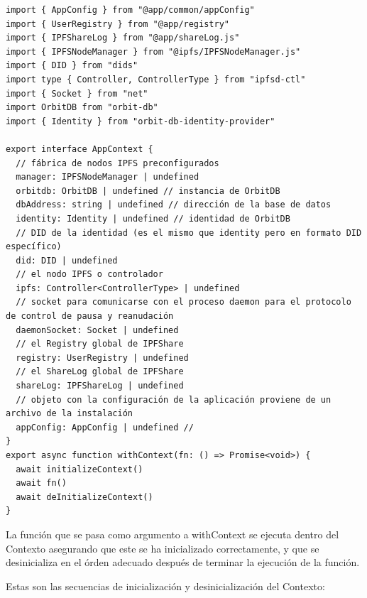 \begin{verbatim}
import { AppConfig } from "@app/common/appConfig"
import { UserRegistry } from "@app/registry"
import { IPFShareLog } from "@app/shareLog.js"
import { IPFSNodeManager } from "@ipfs/IPFSNodeManager.js"
import { DID } from "dids"
import type { Controller, ControllerType } from "ipfsd-ctl"
import { Socket } from "net"
import OrbitDB from "orbit-db"
import { Identity } from "orbit-db-identity-provider"

export interface AppContext {
  // fábrica de nodos IPFS preconfigurados
  manager: IPFSNodeManager | undefined
  orbitdb: OrbitDB | undefined // instancia de OrbitDB
  dbAddress: string | undefined // dirección de la base de datos
  identity: Identity | undefined // identidad de OrbitDB
  // DID de la identidad (es el mismo que identity pero en formato DID específico)
  did: DID | undefined 
  // el nodo IPFS o controlador
  ipfs: Controller<ControllerType> | undefined 
  // socket para comunicarse con el proceso daemon para el protocolo de control de pausa y reanudación
  daemonSocket: Socket | undefined 
  // el Registry global de IPFShare
  registry: UserRegistry | undefined
  // el ShareLog global de IPFShare
  shareLog: IPFShareLog | undefined
  // objeto con la configuración de la aplicación proviene de un archivo de la instalación
  appConfig: AppConfig | undefined // 
}
export async function withContext(fn: () => Promise<void>) {
  await initializeContext()
  await fn()
  await deInitializeContext()
}
\end{verbatim}
La función que se pasa como argumento a withContext se ejecuta dentro del Contexto asegurando que este se ha inicializado correctamente, y que se desinicializa en el órden adecuado después de terminar la ejecución de la función.

Estas son las secuencias de inicialización y desinicialización del Contexto:

